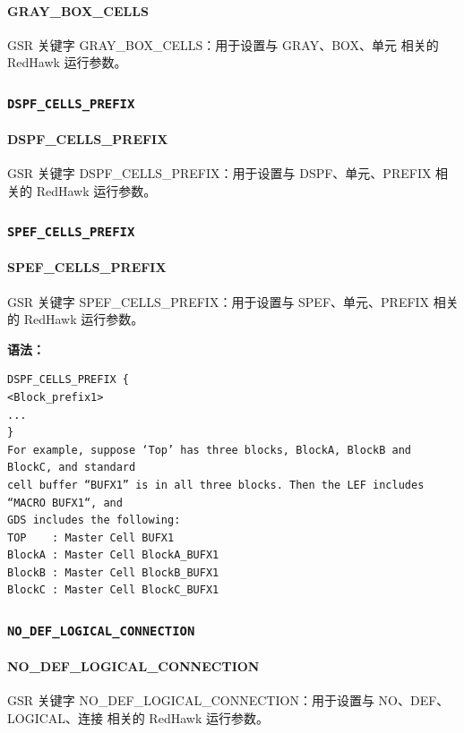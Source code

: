 \paragraph*{GRAY_BOX_CELLS}

GSR 关键字 GRAY_BOX_CELLS：用于设置与 GRAY、BOX、单元 相关的 RedHawk 运行参数。

\subsubsection{\texttt{DSPF_CELLS_PREFIX}}
\paragraph*{DSPF_CELLS_PREFIX}

GSR 关键字 DSPF_CELLS_PREFIX：用于设置与 DSPF、单元、PREFIX 相关的 RedHawk 运行参数。

\subsubsection{\texttt{SPEF_CELLS_PREFIX}}
\paragraph*{SPEF_CELLS_PREFIX}

GSR 关键字 SPEF_CELLS_PREFIX：用于设置与 SPEF、单元、PREFIX 相关的 RedHawk 运行参数。

\textbf{语法：}
\begin{lstlisting}
DSPF_CELLS_PREFIX {
<Block_prefix1>
...
}
For example, suppose ‘Top’ has three blocks, BlockA, BlockB and BlockC, and standard
cell buffer “BUFX1” is in all three blocks. Then the LEF includes “MACRO BUFX1“, and
GDS includes the following:
TOP    : Master Cell BUFX1
BlockA : Master Cell BlockA_BUFX1
BlockB : Master Cell BlockB_BUFX1
BlockC : Master Cell BlockC_BUFX1
\end{lstlisting}

\subsubsection{\texttt{NO_DEF_LOGICAL_CONNECTION}}
\paragraph*{NO_DEF_LOGICAL_CONNECTION}

GSR 关键字 NO_DEF_LOGICAL_CONNECTION：用于设置与 NO、DEF、LOGICAL、连接 相关的 RedHawk 运行参数。

